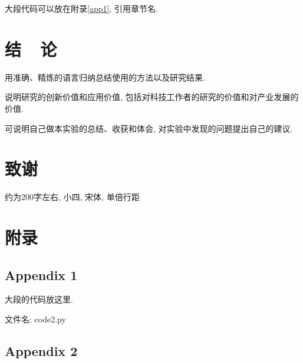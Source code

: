 \documentclass{urtemp}
\begin{document}
大段代码可以放在附录\ref{app1}, 引用章节名.

\section{结~~论}
用准确、精炼的语言归纳总结使用的方法以及研究结果. 

说明研究的创新价值和应用价值, 包括对科技工作者的研究的价值和对产业发展的价值. 

可说明自己做本实验的总结、收获和体会, 对实验中发现的问题提出自己的建议. 



{\centering\section*{致谢}}
约为200字左右, 小四, 宋体, 单倍行距


\renewcommand\refname{\heiti\wuhao\centerline{参考文献}\global\def\refname{参考文献}}
\vskip 12pt

\let\OLDthebibliography\thebibliography
\renewcommand\thebibliography[1]{
    \OLDthebibliography{#1}
    \setlength{\parskip}{0pt}
    \setlength{\itemsep}{0pt plus 0.3ex}
}

{
\renewcommand{\baselinestretch}{0.9}


}

\section*{附录}

\subsection*{Appendix 1}\label{app1}

大段的代码放这里.

文件名: code2.py


\subsection*{Appendix 2}
\end{document}

